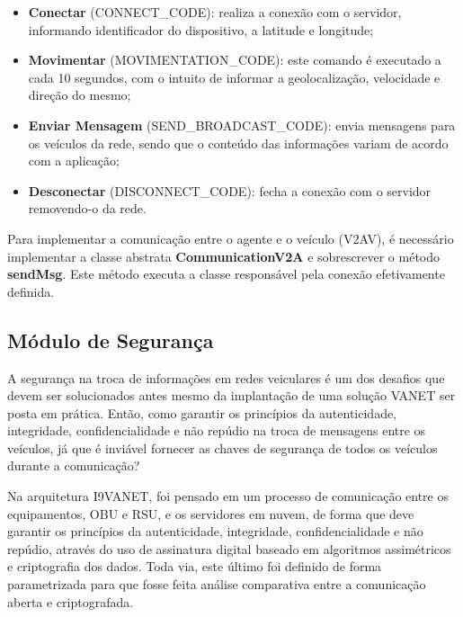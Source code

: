 \documentclass[
	12pt,				%
	oneside,			%
	a4paper,			%
	english,			%
	brazil				%
	]{abntex2ppgsi}
\begin{document}
\begin{itemize}
	\item{\textbf{Conectar} (CONNECT\_CODE): realiza a conexão com o servidor, informando identificador do dispositivo, a latitude e longitude;}	
	\item{\textbf{Movimentar} (MOVIMENTATION\_CODE): este comando é executado a cada 10 segundos, com o intuito de informar a geolocalização, velocidade e direção do mesmo;}	
	\item{\textbf{Enviar Mensagem} (SEND\_BROADCAST\_CODE): envia mensagens para os veículos da rede, sendo que o conteúdo das informações variam de acordo com a aplicação;}	
	\item{\textbf{Desconectar} (DISCONNECT\_CODE): fecha a conexão com o servidor removendo-o da rede.}	
\end{itemize} 

Para implementar a comunicação entre o agente e o veículo (V2AV), é necessário implementar a classe abstrata \textbf{CommunicationV2A} e sobrescrever o método \textbf{sendMsg}. Este método executa a classe responsável pela conexão efetivamente definida.


\subsection{Módulo de Segurança}


A segurança na troca de informações em redes veiculares é um dos desafios que devem ser solucionados antes mesmo da implantação de uma solução VANET ser posta em prática. Então, como garantir os princípios da autenticidade, integridade, confidencialidade e  não repúdio na troca de mensagens entre os veículos, já que é inviável fornecer as chaves de segurança de todos os veículos durante a comunicação? 

Na arquitetura I9VANET, foi pensado em um processo de comunicação entre os equipamentos, OBU e RSU, e os servidores em nuvem, de forma que deve garantir os princípios da autenticidade, integridade, confidencialidade e não repúdio, através do uso de assinatura digital baseado em algoritmos assimétricos e criptografia dos dados. Toda via, este último foi definido de forma parametrizada para que fosse feita análise comparativa entre a comunicação aberta e criptografada.
\end{document}
